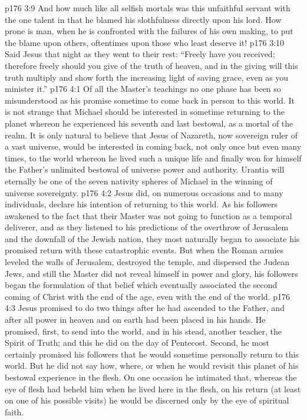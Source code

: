 \vs p176 3:9 And how much like all selfish mortals was this unfaithful servant with the one talent in that he blamed his slothfulness directly upon his lord. How prone is man, when he is confronted with the failures of his own making, to put the blame upon others, oftentimes upon those who least deserve it!
\vs p176 3:10 Said Jesus that night as they went to their rest: \textcolor{ubdarkred}{“Freely have you received; therefore freely should you give of the truth of heaven, and in the giving will this truth multiply and show forth the increasing light of saving grace, even as you minister it.”}
\vs p176 4:1 Of all the Master’s teachings no one phase has been so misunderstood as his promise sometime to come back in person to this world. It is not strange that Michael should be interested in sometime returning to the planet whereon he experienced his seventh and last bestowal, as a mortal of the realm. It is only natural to believe that Jesus of Nazareth, now sovereign ruler of a vast universe, would be interested in coming back, not only once but even many times, to the world whereon he lived such a unique life and finally won for himself the Father’s unlimited bestowal of universe power and authority. Urantia will eternally be one of the seven nativity spheres of Michael in the winning of universe sovereignty.
\vs p176 4:2 Jesus did, on numerous occasions and to many individuals, declare his intention of returning to this world. As his followers awakened to the fact that their Master was not going to function as a temporal deliverer, and as they listened to his predictions of the overthrow of Jerusalem and the downfall of the Jewish nation, they most naturally began to associate his promised return with these catastrophic events. But when the Roman armies leveled the walls of Jerusalem, destroyed the temple, and dispersed the Judean Jews, and still the Master did not reveal himself in power and glory, his followers began the formulation of that belief which eventually associated the second coming of Christ with the end of the age, even with the end of the world.\plusone
\vs p176 4:3 Jesus promised to do two things after he had ascended to the Father, and after all power in heaven and on earth had been placed in his hands. He promised, first, to send into the world, and in his stead, another teacher, the Spirit of Truth; and this he did on the day of Pentecost. Second, he most certainly promised his followers that he would sometime personally return to this world. But he did not say how, where, or when he would revisit this planet of his bestowal experience in the flesh. On one occasion he intimated that, whereas the eye of flesh had beheld him when he lived here in the flesh, on his return (at least on one of his possible visits) he would be discerned only by the eye of spiritual faith.
